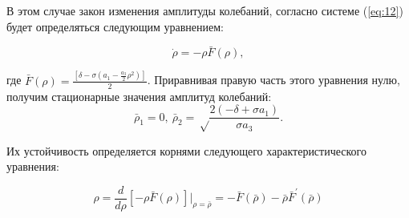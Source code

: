 В этом случае закон изменения амплитуды колебаний, согласно системе (\ref{eq:12})  будет определяться следующим уравнением: 

\begin{equation}
\label{eq:19}
\dot\rho=-\rho \bar{F}(\rho),
\end{equation}

где $\bar{F}(\rho)=\frac{[\delta-\sigma(a_1-\frac{a_3}{2}\rho^2)]}{2}$. Приравнивая правую часть этого уравнения нулю, получим стационарные значения амплитуд колебаний:
\begin{equation}
\label{eq:20}
\bar{\rho}_1=0,~ \bar{\rho}_2=\sqrt\frac{2(-\delta+\sigma a_1)}{\sigma a_3}.
\end{equation}

Их устойчивость определяется корнями следующего характеристического уравнения:

\begin{equation}
\label{eq:21}
\rho=\frac{d}{d\rho}[-\rho\bar{F}(\rho)]\bigg|_{\rho=\bar{\rho}}=-\bar{F}(\bar{\rho})-\bar{\rho}\bar{F}^{'}(\bar{\rho})
\end{equation}

